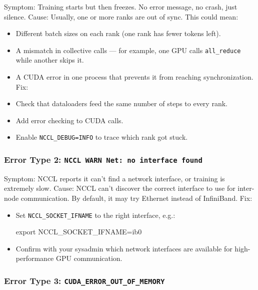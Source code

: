 \documentclass[
  letterpaper,
  DIV=11,
  numbers=noendperiod]{scrreprt}
\newenvironment{Shaded}{\begin{snugshade}}{\end{snugshade}}
\newcommand{\BuiltInTok}[1]{\textcolor[rgb]{0.00,0.23,0.31}{#1}}
\newcommand{\NormalTok}[1]{\textcolor[rgb]{0.00,0.23,0.31}{#1}}
\newcommand{\OperatorTok}[1]{\textcolor[rgb]{0.37,0.37,0.37}{#1}}
\newcommand{\VariableTok}[1]{\textcolor[rgb]{0.07,0.07,0.07}{#1}}
\providecommand{\tightlist}{%
  \setlength{\itemsep}{0pt}\setlength{\parskip}{0pt}}
\begin{document}
Symptom: Training starts but then freezes. No error message, no crash,
just silence. Cause: Usually, one or more ranks are out of sync. This
could mean:

\begin{itemize}
\tightlist
\item
  Different batch sizes on each rank (one rank has fewer tokens left).
\item
  A mismatch in collective calls --- for example, one GPU calls
  \texttt{all\_reduce} while another skips it.
\item
  A CUDA error in one process that prevents it from reaching
  synchronization. Fix:
\item
  Check that dataloaders feed the same number of steps to every rank.
\item
  Add error checking to CUDA calls.
\item
  Enable \texttt{NCCL\_DEBUG=INFO} to trace which rank got stuck.
\end{itemize}

\subsubsection{\texorpdfstring{Error Type 2:
\texttt{NCCL\ WARN\ Net:\ no\ interface\ found}}{Error Type 2: NCCL WARN Net: no interface found}}\label{error-type-2-nccl-warn-net-no-interface-found}

Symptom: NCCL reports it can't find a network interface, or training is
extremely slow. Cause: NCCL can't discover the correct interface to use
for inter-node communication. By default, it may try Ethernet instead of
InfiniBand. Fix:

\begin{itemize}
\item
  Set \texttt{NCCL\_SOCKET\_IFNAME} to the right interface, e.g.:

\begin{Shaded}
\begin{Highlighting}[]
\BuiltInTok{export} \VariableTok{NCCL\_SOCKET\_IFNAME}\OperatorTok{=}\NormalTok{ib0}
\end{Highlighting}
\end{Shaded}
\item
  Confirm with your sysadmin which network interfaces are available for
  high-performance GPU communication.
\end{itemize}

\subsubsection{\texorpdfstring{Error Type 3:
\texttt{CUDA\_ERROR\_OUT\_OF\_MEMORY}}{Error Type 3: CUDA\_ERROR\_OUT\_OF\_MEMORY}}\label{error-type-3-cuda_error_out_of_memory}
\end{document}
